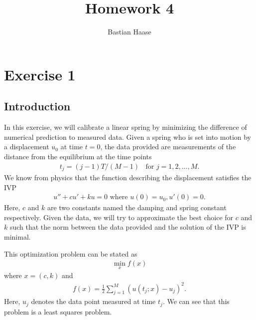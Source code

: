 \documentclass{article}
\title{Homework 4}
\date{}
\author{Bastian Haase}
\begin{document}
\maketitle
\tableofcontents
\newpage 
\section{Exercise 1}
\subsection{Introduction}
In this exercise, we will calibrate a linear spring by minimizing
the difference of numerical prediction to measured data. Given a spring
who is set into motion by a displacement $u_0$ at time $t=0$, the data
provided are measurements of the distance from the equilibrium at
the time points 
\begin{align*}
  t_j=(j-1)T/(M-1) \;\; \textrm{ for } j=1,2,\ldots,M.
\end{align*}
We know from physics that the function describing the displacement
satisfies the IVP 
\begin{align}
  u''+cu'+ku=0 \textrm{ where } u(0)=u_0, u'(0)=0.
  \label{ode}
\end{align}
Here, $c$ and $k$ are two constants named the damping and spring constant
respectively. Given the data, we will try to approximate the best choice
for $c$ and $k$ such that the norm between the data provided and the
solution of the IVP is minimal. \par
This optimization problem can be stated as 
\begin{align*}
  \min_{x} f(x)
\end{align*}
where $x=(c,k)$ and 
\begin{align*}
  f(x)=\frac{1}{2}\sum_{j=1}^{M}\left ( u(t_j;x)-u_j \right )^2.
\end{align*}
Here, $u_j$ denotes the data point measured at time $t_j$. We can see that this
problem is a least squares problem.
\end{document}
